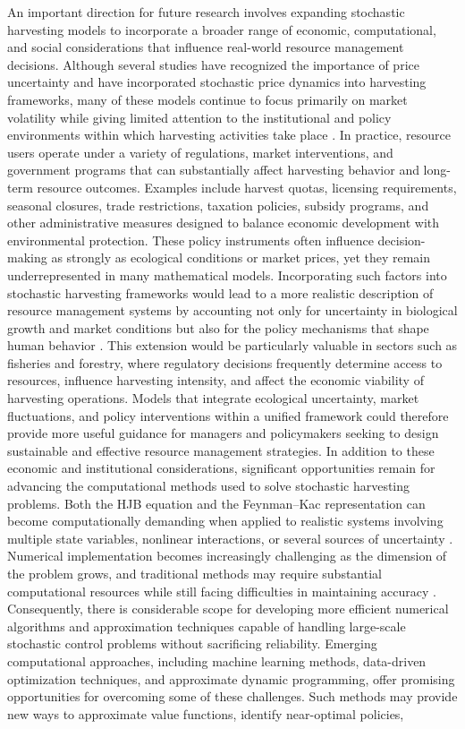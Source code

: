\documentclass[11pt]{article}
\begin{document}
	An important direction for future research involves expanding stochastic harvesting models to incorporate a broader range of economic, computational, and social considerations that influence real-world resource management decisions. Although several studies have recognized the importance of price uncertainty and have incorporated stochastic price dynamics into harvesting frameworks, many of these models continue to focus primarily on market volatility while giving limited attention to the institutional and policy environments within which harvesting activities take place \citep{pramanik2024estimation,pramanik2023cont}. In practice, resource users operate under a variety of regulations, market interventions, and government programs that can substantially affect harvesting behavior and long-term resource outcomes. Examples include harvest quotas, licensing requirements, seasonal closures, trade restrictions, taxation policies, subsidy programs, and other administrative measures designed to balance economic development with environmental protection. These policy instruments often influence decision-making as strongly as ecological conditions or market prices, yet they remain underrepresented in many mathematical models. Incorporating such factors into stochastic harvesting frameworks would lead to a more realistic description of resource management systems by accounting not only for uncertainty in biological growth and market conditions but also for the policy mechanisms that shape human behavior \citep{pramanik2025strategic,pramanik2025impact}. This extension would be particularly valuable in sectors such as fisheries and forestry, where regulatory decisions frequently determine access to resources, influence harvesting intensity, and affect the economic viability of harvesting operations. Models that integrate ecological uncertainty, market fluctuations, and policy interventions within a unified framework could therefore provide more useful guidance for managers and policymakers seeking to design sustainable and effective resource management strategies. In addition to these economic and institutional considerations, significant opportunities remain for advancing the computational methods used to solve stochastic harvesting problems. Both the HJB equation and the Feynman--Kac representation can become computationally demanding when applied to realistic systems involving multiple state variables, nonlinear interactions, or several sources of uncertainty \citep{pramanik2025strategies,pramanik2023optimization001}. Numerical implementation becomes increasingly challenging as the dimension of the problem grows, and traditional methods may require substantial computational resources while still facing difficulties in maintaining accuracy \citep{carey2006race}. Consequently, there is considerable scope for developing more efficient numerical algorithms and approximation techniques capable of handling large-scale stochastic control problems without sacrificing reliability. Emerging computational approaches, including machine learning methods, data-driven optimization techniques, and approximate dynamic programming, offer promising opportunities for overcoming some of these challenges. Such methods may provide new ways to approximate value functions, identify near-optimal policies, 
\end{document}
